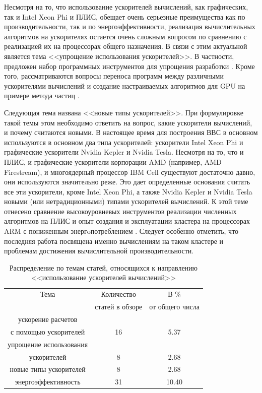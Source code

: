 Несмотря на то, что использование ускорителей вычислений, как графических, так и Intel Xeon Phi и ПЛИС, обещает
очень серьезные преимущества как по производительности, так и по энергоэффективности, реализация вычислительных алгоритмов на  ускорителях остается очень сложным вопросом по сравнению с реализацией их на процессорах общего назначения. В связи с этим актуальной является тема <<упрощение использования ускорителей>>.
В частности, предложен набор программных инструментов для упрощения разработки \cite{Dongarra2015}.
Кроме того, рассматриваются вопросы переноса программ между различными ускорителями вычислений \cite{Subotic2013450} и 
создание настраиваемых алгоритмов для GPU на примере метода частиц \cite{Decyk2011}. 	 

Следующая тема названа <<новые типы ускорителей>>. При формулировке такой темы этом необходимо ответить на вопрос, какие ускорители вычислений, и почему считаются новыми. В настоящее время для построения ВВС в основном используются в основном два типа ускорителей: ускорители Intel Xeon Phi и графические ускорители Nvidia Kepler и Nvidia Tesla. Несмотря на то, что и ПЛИС, и графические ускорители корпорации AMD (например, AMD Firestream), и многоядерный процессор IBM Cell существуют достаточно давно, они используются значительно реже. Это дает определенные основания считать все эти ускорители, кроме 
Intel Xeon Phi, а также Nvidia Kepler и Nvidia Tesla новыми (или нетрадиционными) типами ускорителей вычислений. К этой теме отнесено сравнение высокоуровневых инструментов реализации численных алгоритмов на ПЛИС \cite{Warne201495} и опыт создания и эксплуатации кластера на процессорах ARM с пониженным энергoпотреблением \cite{Rajovic2014}. Следует особенно отметить, что последняя работа посвящена именно вычислениям на таком кластере и проблемам достижения вычислительной производительности.

\begin{table}[ht]
	\caption{Распределение по темам статей, относящихся к направлению
		<<использование ускорителей вычислений>>}
	\begin{center}
		\begin{tabular}{|c|c|c|}
			\hline
			Тема                       & Количество          & В \%           \\
			& статей в обзоре     & от общего числа  \\ \hline 
			
			ускорение расчетов    &    &       \\ 
			с помощью ускорителей & 16 & 5.37  \\ \hline 
			упрощение использования  & & \\
			ускорителей & 8  & 2.68   \\ \hline 
			новые типы ускорителей & 8 & 2.68    \\ \hline 
			энергоэффективность &  31  & 10.40     \\ \hline 
		\end{tabular}
	\end{center}
	\label{topic_GPU}
\end{table}

